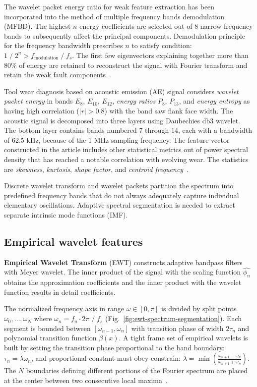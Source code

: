 The wavelet packet energy ratio for weak feature extraction has been incorporated into the method of multiple frequency bands demodulation (MFBD). The highest $n$ energy coefficients are selected out of 8 narrow frequency bands to subsequently affect the principal components. Demodulation principle for the frequency bandwidth prescribes $n$ to satisfy condition: $1\;/\;2^n > f_{\mathrm{modulation}}\;/\;f_s$. The first few eigenvectors explaining together more than 80\% of energy are retained to reconstruct the signal with Fourier transform and retain the weak fault components~\cite{song_mfbd_2021}.

Tool wear diagnosis based on acoustic emission (AE) signal considers \emph{wavelet packet energy} in bands $E_{8}$, $E_{10}$, $E_{12}$, \emph{energy ratios} $P_{8}$, $P_{13}$, and \emph{energy entropy} as having high correlation ($|r| > 0.8$) with the band saw flank face width. The acoustic signal is decomposed into three layers using Daubechies db3 wavelet. The bottom layer contains bands numbered 7 through 14, each with a bandwidth of 62.5 kHz, because of the 1 MHz sampling frequency. The feature vector constructed in the article includes other statistical metrics out of power spectral density that has reached a notable correlation with evolving wear. The statistics are \emph{skewness}, \emph{kurtosis}, \emph{shape factor}, and \emph{centroid frequency}~\cite{zhuo_research_2022}.

Discrete wavelet transform and wavelet packets partition the spectrum into predefined frequency bands that do not always adequately capture individual elementary oscillations. Adaptive spectral segmentation is needed to extract separate intrinsic mode functions (IMF).

\subsection{Empirical wavelet features}
\textbf{Empirical Wavelet Transform} (EWT) constructs adaptive bandpass filters with Meyer wavelet. The inner product of the signal with the scaling function $\hat{\phi_n}$ obtains the approximation coefficients and the inner product with the wavelet function results in detail coefficients.

The normalized frequency axis in range $\omega \in [0, \pi]$ is divided by split points $\omega_0, \dots, \omega_N$ where $\omega_n = f_n \cdot 2 \pi\;/\;f_s$ (Fig.~\ref{fig:ewt-spectrum-segmentation}). Each segment is bounded between $[\omega_{n-1}, \omega_n]$ with transition phase of width $2\tau_n$ and polynomial transition function $\beta(x)$. A tight frame set of empirical wavelets is built by setting the transition phase proportional to the band boundary: $\tau_n = \lambda \omega_n$, and proportional constant must obey constrain: $\lambda = \min\left(\frac{\omega_{n+1} - \omega_n}{\omega_{n+1} + \omega_n}\right)$. The $N$ boundaries defining different portions of the Fourier spectrum are placed at the center between two consecutive local maxima~\cite{gilles_empirical_2013}.

